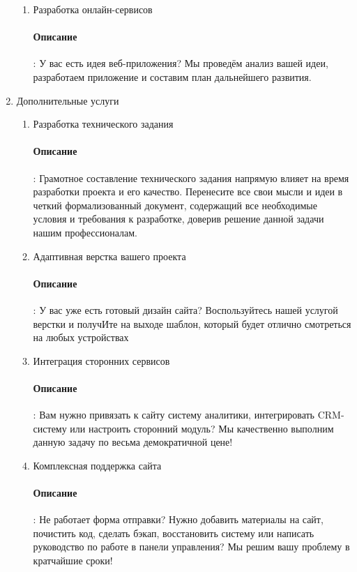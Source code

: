 \begin{enumerate}
\begin{enumerate}
    \item Разработка онлайн-сервисов \paragraph{Описание}: У вас есть идея веб-приложения? Мы проведём анализ вашей идеи, разработаем приложение и составим план дальнейшего развития.
  \end{enumerate}

  \item Дополнительные услуги
  \begin{enumerate}
    \item Разработка технического задания
      \paragraph{Описание}: Грамотное составление технического задания напрямую влияет на время разработки проекта и его качество. Перенесите все свои мысли и идеи в четкий формализованный документ, содержащий все необходимые условия и требования к разработке, доверив решение данной задачи нашим профессионалам.
    \item Адаптивная верстка вашего проекта
      \paragraph{Описание}: У вас уже есть готовый дизайн сайта? Воспользуйтесь нашей услугой верстки и получИте на выходе шаблон, который будет отлично смотреться на любых устройствах
    \item Интеграция сторонних сервисов
      \paragraph{Описание}: Вам нужно привязать к сайту систему аналитики, интегрировать CRM-систему или настроить сторонний модуль? Мы качественно выполним данную задачу по весьма демократичной цене!
    \item Комплексная поддержка сайта
      \paragraph{Описание}: Не работает форма отправки? Нужно добавить материалы на сайт, почистить код, сделать бэкап, восстановить систему или написать руководство по работе в панели управления? Мы решим вашу проблему в кратчайшие сроки!
  \end{enumerate}

\end{enumerate}

